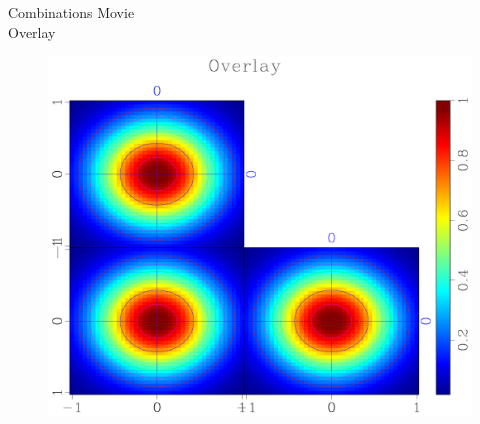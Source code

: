 
\begin{frame}
  \begin{block}{Combinations}
    Movie \\
    Overlay \\

     \begin{figure}
     \includegraphics[scale=0.25]{plot/Fig/ganom-7.pdf}
     \end{figure}


  \end{block}
\end{frame}

